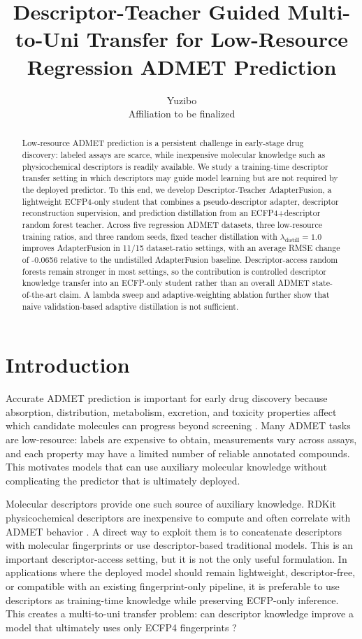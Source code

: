 \documentclass[11pt]{article}
\title{Descriptor-Teacher Guided Multi-to-Uni Transfer for Low-Resource Regression ADMET Prediction}
\author{Yuzibo\\\small Affiliation to be finalized}
\date{}
\begin{document}
\maketitle

\begin{abstract}
Low-resource ADMET prediction is a persistent challenge in early-stage drug
discovery: labeled assays are scarce, while inexpensive molecular knowledge
such as physicochemical descriptors is readily available. We study a
training-time descriptor transfer setting in which descriptors may guide model
learning but are not required by the deployed predictor. To this end, we
develop Descriptor-Teacher AdapterFusion, a lightweight ECFP4-only student
that combines a pseudo-descriptor adapter, descriptor reconstruction
supervision, and prediction distillation from an ECFP4+descriptor random
forest teacher. Across five regression ADMET datasets, three low-resource
training ratios, and three random seeds, fixed teacher distillation with
$\lambda_{\mathrm{distill}}=1.0$ improves AdapterFusion in 11/15
dataset-ratio settings, with an average RMSE change of -0.0656 relative to the
undistilled AdapterFusion baseline. Descriptor-access random forests remain
stronger in most settings, so the contribution is controlled descriptor
knowledge transfer into an ECFP-only student rather than an overall ADMET
state-of-the-art claim. A lambda sweep and adaptive-weighting ablation further
show that naive validation-based adaptive distillation is not sufficient.
\end{abstract}

\section{Introduction}

Accurate ADMET prediction is important for early drug discovery because
absorption, distribution, metabolism, excretion, and toxicity properties affect
which candidate molecules can progress beyond screening
\citep{Vamathevan2019,Butler2018,Xiong2021ADMETlab}. Many ADMET tasks are
low-resource: labels are expensive to obtain, measurements vary across assays,
and each property may have a limited number of reliable annotated compounds.
This motivates models that can use auxiliary molecular knowledge without
complicating the predictor that is ultimately deployed.

Molecular descriptors provide one such source of auxiliary knowledge. RDKit
physicochemical descriptors are inexpensive to compute and often correlate with
ADMET behavior \citep{RDKit2026}. A direct way to exploit them is to
concatenate descriptors with molecular fingerprints or use descriptor-based
traditional models. This is an important descriptor-access setting, but it is
not the only useful formulation. In applications where the deployed model
should remain lightweight, descriptor-free, or compatible with an existing
fingerprint-only pipeline, it is preferable to use descriptors as training-time
knowledge while preserving ECFP-only inference. This creates a multi-to-uni
transfer problem: can descriptor knowledge improve a model that ultimately
uses only ECFP4 fingerprints \citep{Rogers2010}?
\end{document}
